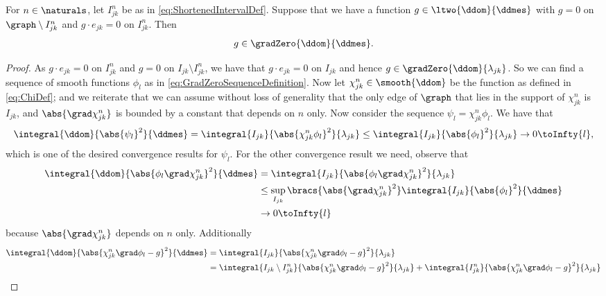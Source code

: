 \begin{lemma} \label{lem:SegGradExtend}
	For $n\in\naturals$, let $I_{jk}^n$ be as in \eqref{eq:ShortenedIntervalDef}.
	Suppose that we have a function $g\in\ltwo{\ddom}{\ddmes}$ with $g=0$ on $\graph\setminus I_{jk}^{n}$ and $g\cdot e_{jk}=0$ on $I_{jk}^{n}$.
	Then 
	\begin{align*}
		g\in\gradZero{\ddom}{\ddmes}.
	\end{align*}
\end{lemma}
\begin{proof}
	As $g\cdot e_{jk}=0$ on $I_{jk}^{n}$ and $g=0$ on $I_{jk}\setminus I_{jk}^{n}$, we have that $g\cdot e_{jk}=0$ on $I_{jk}$ and hence $g\in\gradZero{\ddom}{\lambda_{jk}}$.
	So we can find a sequence of smooth functions $\phi_l$ as in \eqref{eq:GradZeroSequenceDefinition}.
	Now let $\chi_{jk}^{n}\in\smooth{\ddom}$ be the function as defined in \eqref{eq:ChiDef}; and we reiterate that we can assume without loss of generality that the only edge of $\graph$ that lies in the support of $\chi_{jk}^n$ is $I_{jk}$, and $\abs{\grad\chi_{jk}^{n}}$ is bounded by a constant that depends on $n$ only.
	Now consider the sequence $\psi_l = \chi_{jk}^{n}\phi_l$.
	We have that
	\begin{align*}
		\integral{\ddom}{\abs{\psi_l}^2}{\ddmes} = \integral{I_{jk}}{\abs{\chi_{jk}^{n}\phi_l}^2}{\lambda_{jk}}
		\leq \integral{I_{jk}}{\abs{\phi_l}^2}{\lambda_{jk}} \rightarrow0 \toInfty{l},
	\end{align*}
	which is one of the desired convergence results for $\psi_l$.
	For the other convergence result we need, observe that
	\begin{align*}
		\integral{\ddom}{\abs{\phi_l\grad\chi_{jk}^{n}}^2}{\ddmes} &= \integral{I_{jk}}{\abs{\phi_l\grad\chi_{jk}^{n}}^2}{\lambda_{jk}} \\
		&\leq \sup_{I_{jk}}\bracs{\abs{\grad\chi_{jk}^{n}}^{2}}\integral{I_{jk}}{\abs{\phi_l}^2}{\ddmes} \\
		&\rightarrow 0 \toInfty{l}
	\end{align*}
	because $\abs{\grad\chi_{jk}^{n}}$ depends on $n$ only.
	Additionally
	\begin{align*}
		\integral{\ddom}{\abs{\chi_{jk}^n\grad\phi_l - g}^2}{\ddmes} &= \integral{I_{jk}}{\abs{\chi_{jk}^n\grad\phi_l - g}^2}{\lambda_{jk}} \\
		&= \integral{I_{jk}\setminus I_{jk}^n}{\abs{\chi_{jk}^n\grad\phi_l - g}^2}{\lambda_{jk}} + \integral{I_{jk}^n}{\abs{\chi_{jk}^n\grad\phi_l - g}^2}{\lambda_{jk}} \\

\end{align*}
\end{proof}
